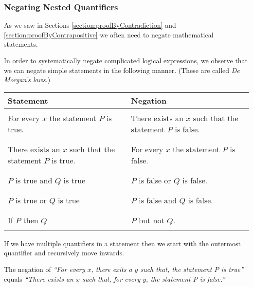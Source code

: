 	\subsubsection{Negating Nested Quantifiers}
	As we saw in Sections \ref{section:proofByContradiction} and \ref{section:proofByContrapositive} we often need to negate mathematical statements.

	In order to systematically negate complicated logical expressions, we observe that we can negate simple statements in the following manner. (These are called {\it De Morgan's laws}.)
	\begin{center}
		\begin{tabular}{|p{}|p{}|}
			\hline Statement
				&
					Negation \\ \hline & \\
			For every $x$ the statement $P$ is true.
				&
					There exists an $x$ such that the statement $P$ is false.
					\\& \\ \hline &\\
			There exists an $x$ such that the statement $P$ is true.
				&
					For every $x$ the statement $P$ is false.
					\\& \\ \hline &\\
			$P$ is true and $Q$ is true
				&
					$P$ is false or $Q$ is false.
					\\& \\ \hline &\\
			$P$ is true or $Q$ is true
				&
					$P$ is false and $Q$ is false.
					\\& \\ \hline &\\
			If $P$ then $Q$
				&
					$P$ but not $Q$.
					\\& \\ \hline
	\end{tabular}
	\end{center}
	If we have multiple quantifiers in a statement then we start with the outermost quantifier and recursively move inwards.
	\begin{example}
		The negation of {\it ``For every $x$, there exits a $y$ such that, the statement $P$ is true''} equals {\it ``There exists an $x$ such that, for every $y$, the statement $P$ is false.''}
	\end{example}
